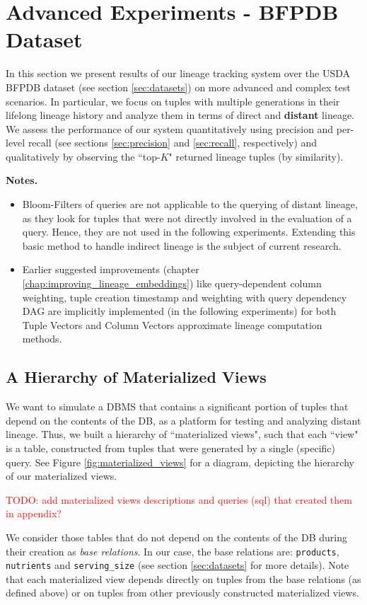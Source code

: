 \section{Advanced Experiments - BFPDB Dataset}
In this section we present results of our lineage tracking system over the USDA BFPDB dataset (see section \ref{sec:datasets}) on more advanced and complex test scenarios. In particular, we focus on tuples with multiple generations in their lifelong lineage history and analyze them in terms of direct and \textbf{distant} lineage.
We assess the performance of our system quantitatively using precision and per-level recall (see sections \ref{sec:precision} and \ref{sec:recall}, respectively) and qualitatively by observing the ``top-$K$" returned lineage tuples (by similarity).
\par\textbf{Notes.}
\begin{itemize}
    \item Bloom-Filters of queries are not applicable to the querying of distant lineage, as they look for tuples that were not directly involved in the evaluation of a query. Hence, they are not used in the following experiments. Extending this basic method to handle indirect lineage is the subject of current research.
    \item Earlier suggested improvements (chapter \ref{chap:improving_lineage_embeddings}) like query-dependent column weighting, tuple creation timestamp and weighting with query dependency DAG are implicitly implemented (in the following experiments) for both Tuple Vectors and Column Vectors approximate lineage computation methods.
\end{itemize}


\subsection{A Hierarchy of Materialized Views}
We want to simulate a DBMS that contains a significant portion of tuples that depend on the contents of the DB, as a platform for testing and analyzing distant lineage. Thus, we built a hierarchy of ``materialized views", such that each ``view" is a table, constructed from tuples that were generated by a single (specific) query. See Figure \ref{fig:materialized_views} for a diagram, depicting the hierarchy of our materialized views.

\textcolor{red}{TODO: add materialized views descriptions and queries (sql) that created them in appendix?}
\par We consider those tables that do not depend on the contents of the DB during their creation  as \textit{base relations}. In our case, the base relations are: \texttt{products}, \texttt{nutrients} and \texttt{serving\_size} (see section \ref{sec:datasets} for more details). Note that each materialized view depends directly on tuples from the base relations (as defined above) or on tuples from other previously constructed materialized views.

